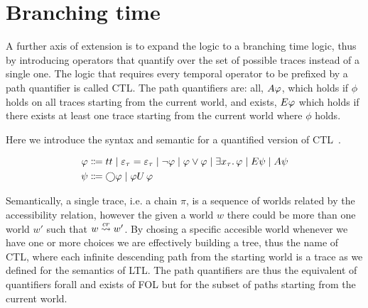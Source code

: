 \section{Branching time}
A further axis of extension is to expand the logic to a branching time logic, thus by introducing operators that
quantify over the set of possible traces instead of a single one. The logic that requires every temporal operator to be
prefixed by a path quantifier is called \ac{CTL}. The path quantifiers are: all, $A{\varphi}$,
which holds if $\phi$ holds on all traces starting from the current world, and exists, $E{\varphi}$ which holds if
there exists at least one trace starting from the current world where $\phi$ holds.

Here we introduce the syntax and semantic for a quantified version of \ac{CTL}~\cite{hodkinson_decidable_2002}.

\begin{align*}
  \varphi &\Coloneqq tt \;|\; \varepsilon_\tau = \varepsilon_\tau
                    \;|\; \neg\varphi
                    \;|\; \varphi \lor \varphi
                    \;|\; \exists {x_\tau} \ldotp {\varphi}
                    \;|\; E{\psi}
                    \;|\; A{\psi} \\
  \psi &\Coloneqq \bigcirc{\varphi} \;|\; {\varphi}U\,{\varphi}
\end{align*}

Semantically, a single trace, i.e. a chain $\pi$, is a sequence of worlds related by the accessibility relation, however
the given a world $w$ there could be more than one world $w'$ such that $w \overset{cr}{\rightsquigarrow} w'$. By chosing a specific
accesible world whenever we have one or more choices we are effectively building a tree, thus the name of \ac{CTL},
where each infinite descending path from the starting world is a trace as we defined for the semantics of \ac{LTL}. The
path quantifiers are thus the equivalent of quantifiers forall and exists of \ac{FOL} but for the subset of paths
starting from the current world.

